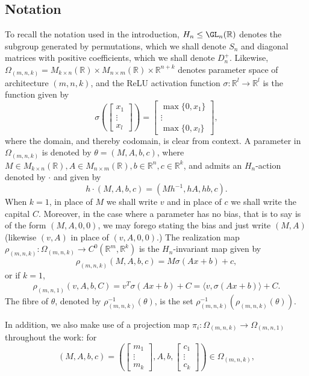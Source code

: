 \documentclass[11pt,letterpaper]{amsart}
\begin{document}
\subsection{Notation}
\par To recall the notation used in the introduction, $H_n\leq \GL_n(\mathbb{R})$ denotes the subgroup generated by permutations, which we shall denote $S_n$ and diagonal matrices with positive coefficients, which we shall denote $D_n^+$. Likewise, $\Omega_{(m,n,k)} = M_{k\times n}(\mathbb{R})\times M_{n\times m}(\mathbb{R})\times \mathbb{R}^{n+k}$ denotes parameter space of architecture $(m,n,k)$, and the ReLU activation function $\sigma:\mathbb{R}^l\rightarrow \mathbb{R}^l$ is the function given by
$$
\sigma\left(\begin{bmatrix} x_1 \\ \vdots \\ x_{l}\end{bmatrix}\right) = \begin{bmatrix} \max\{0, x_1\} \\ \vdots \\ \max\{0, x_{l}\}\end{bmatrix},
$$
where the domain, and thereby codomain, is clear from context. A parameter in $\Omega_{(m,n,k)}$ is denoted by $\theta=(M, A, b, c)$, where $M\in M_{k\times n}(\mathbb{R}), A\in  M_{n\times m}(\mathbb{R}), b\in \mathbb{R}^{n}, c\in \mathbb{R}^k$, and admits an $H_n$-action denoted by $\cdot$ and given by
$$
h\cdot(M, A, b, c) = (Mh^{-1}, hA, hb, c).
$$
When $k=1$, in place of $M$ we shall write $v$ and in place of $c$ we shall write the capital $C$. Moreover, in the case where a parameter has no bias, that is to say is of the form $(M, A, 0,0)$, we may forego stating the bias and just write $(M, A)$ (likewise $(v, A)$ in place of $(v, A, 0,0)$.) The realization map $\rho_{(m,n,k)}:\Omega_{(m,n,k)}\rightarrow C^0(\mathbb{R}^m, \mathbb{R}^k)$ is the $H_n$-invariant map given by 
$$
\rho_{(m,n,k)}(M, A, b, c) = M\sigma(Ax+b)+c,
$$
or if $k=1$,
$$
\rho_{(m,n,1)}(v, A, b, C) = v^T\sigma(Ax+b)+C = \langle v,\sigma(Ax+b)\rangle+C.
$$
The fibre of $\theta$, denoted by $\rho^{-1}_{(m,n,k)}(\theta)$, is  the set $\rho^{-1}_{(m,n,k)}(\rho_{(m,n,k)}(\theta))$. 
\par In addition, we also make use of a projection map $\pi_i:\Omega_{(m,n,k)}\rightarrow \Omega_{(m,n,1)}$ throughout the work: for
$$
    (M, A, b, c) = \left(\begin{bmatrix}
        m_1 \\ \vdots\\ m_k
    \end{bmatrix}, A, b, \begin{bmatrix}
        c_1 \\ \vdots\\ c_k
    \end{bmatrix}\right)\in \Omega_{(m,n,k)},
$$
\end{document}
